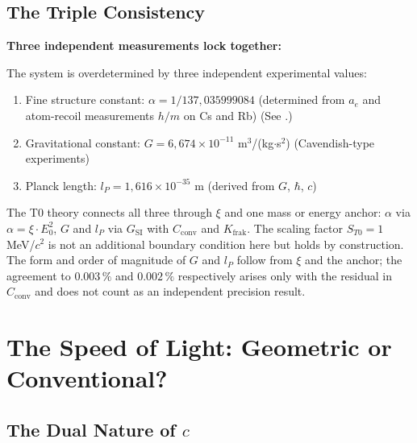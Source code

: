 	\subsection{The Triple Consistency}
	
	\begin{insight}
		\textbf{Three independent measurements lock together:}
		
		The system is overdetermined by three independent experimental values:
		\begin{enumerate}
			\item Fine structure constant: $\alpha = 1/137{,}035999084$ (determined from $a_e$ and atom-recoil measurements $h/m$ on Cs and Rb) (See \cite{fine_structure_constant_En}.)
			\item Gravitational constant: $G = 6{,}674 \times 10^{-11}$ m$^3$/(kg$\cdot$s$^2$) (Cavendish-type experiments)
			\item Planck length: $l_P = 1{,}616 \times 10^{-35}$ m (derived from $G$, $\hbar$, $c$)
		\end{enumerate}
		
		The T0 theory connects all three through $\xi$ and one mass or energy anchor: $\alpha$ via $\alpha = \xi \cdot E_0^2$, $G$ and $l_P$ via $G_{\text{SI}}$ with $C_{\text{conv}}$ and $K_{\text{frak}}$. The scaling factor $S_{T0} = 1$ MeV/$c^2$ is not an additional boundary condition here but holds by construction. The form and order of magnitude of $G$ and $l_P$ follow from $\xi$ and the anchor; the agreement to $0.003\,\%$ and $0.002\,\%$ respectively arises only with the residual in $C_{\text{conv}}$ and does not count as an independent precision result.
	\end{insight}
	
	\section{The Speed of Light: Geometric or Conventional?}
	
	\subsection{The Dual Nature of $c$}
	
